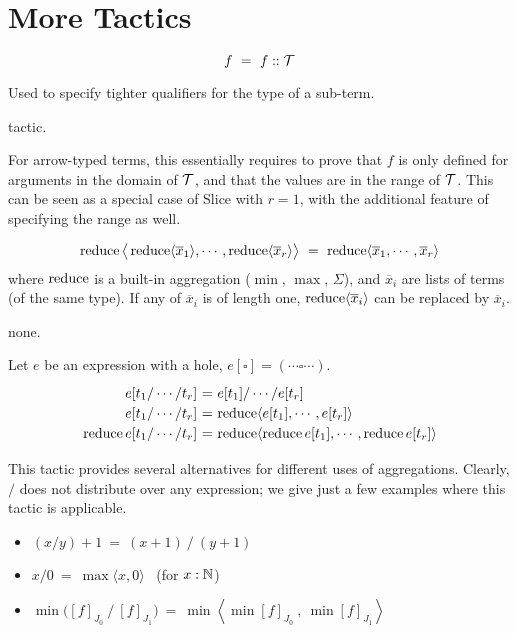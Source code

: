 \section{More Tactics}
\label{annex:more tactics}

 \label{tactics:Shrink}
\[f ~=~ f :: \mathcal{T}\] 

Used to specify tighter qualifiers for the type of a sub-term.

\Obligations tactic.

For arrow-typed terms, this essentially requires to prove that $f$ 
is only defined for arguments in the domain of $\mathcal{T}$, and that the values are in the range of $\mathcal{T}$.
This can be seen as a special case of {\sf Slice} with $r=1$, with the additional
feature of specifying the range as well.


\[\operatorname{reduce}\big\langle \operatorname{reduce}\langle\overline x_1\rangle,\cdots, \operatorname{reduce}\langle\overline x_r\rangle\big\rangle ~=~ \operatorname{reduce} \langle \overline x_1, \cdots, \overline x_r\rangle\]
%
where $\operatorname{reduce}$ is a built-in aggregation ($\min$, $\max$, $\Sigma$), 
and $\overline x_i$ are lists of terms (of the same type).
If any of $\overline x_i$ is of length one, $\operatorname{reduce}\langle\overline x_i\rangle$ can be
replaced by $\overline x_i$.

\Obligations none.

\vspace{3mm}
Let $e$ be an expression with a hole, $e[\square] = (\cdots \square \cdots)$.
%
\[\renewcommand\arraystretch{1.2}
  \begin{array}{@{}r@{~}c@{~}l@{}}
    e[t_1/\cdots/t_r] &=& e[t_1] / \cdots / e[t_r] \\
    e[t_1/\cdots/t_r] &=& \reduce\langle e[t_1],\cdots,e[t_r]\rangle \\
    \reduce e[t_1/\cdots/t_r] &=& \reduce\langle \reduce e[t_1],\cdots,\reduce e[t_r]\rangle
  \end{array}\]

This tactic provides several alternatives for different uses of aggregations.
Clearly, $\big/$ does not distribute over any expression; we give just a few examples
where this tactic is applicable.
\begin{itemize}
  \item $(x/y)+1 ~=~ (x+1)~/~(y+1)$
  \item $x/0 ~=~ \max\langle x,0\rangle$ ~(for $x:\mathbb{N}$)
  \item $\min \big([f]_{J_0}~\big/~[f]_{J_1}\big) ~=~
         \min\left\langle \min [f]_{J_0} ~,~ \min [f]_{J_1}\right\rangle$
\end{itemize}

